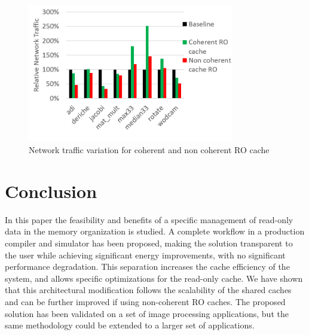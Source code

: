 \documentclass[sigconf]{acmart}
\begin{document}
\begin{figure}
    \centering
    \includegraphics[width=9cm]{./images/resultIncoherent.png}
    \caption{Network traffic variation for coherent and non coherent RO cache}
    \label{resultIncoherent}
\end{figure}

\section{Conclusion}

In this paper the feasibility and benefits of a specific management of read-only data in the memory organization is studied. A complete workflow in a production compiler and simulator has been proposed, making the solution transparent to the user while achieving significant energy improvements, with no significant performance degradation. This separation increases the cache efficiency of the system, and allows specific optimizations for the read-only cache. We have shown that this architectural modification follows the scalability of the shared caches and can be further improved if using non-coherent RO caches. The proposed solution has been validated on a set of image processing applications, but the same methodology could be extended to a larger set of applications. 




 
\end{document}
